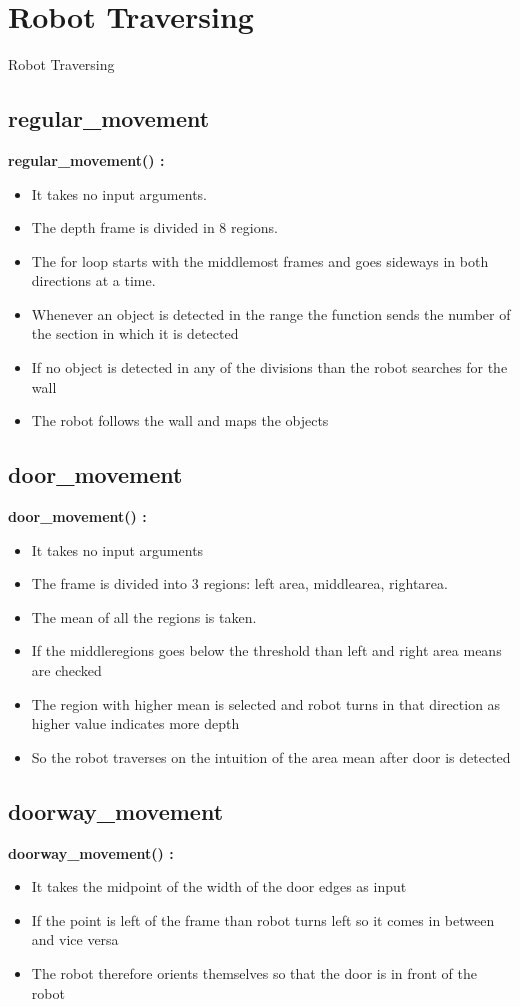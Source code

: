 \documentclass[10pt, a4paper]{beamer}
\begin{document}
\section{Robot Traversing}
\begin{frame}[allowframebreaks]{Robot Traversing}
  \subsection{regular\_movement}
    \textbf{regular\_movement() : }
	\begin{itemize}
	  \item It takes no input arguments.
	  \item The depth frame is divided in 8 regions.
	  \item The for loop starts with the middlemost frames and goes sideways in both directions at a time.
	  \item Whenever an object is detected in the range the function sends the number of the section in which it is detected
	  \item If no object is detected in any of the divisions than the robot searches for the wall
	  \item The robot follows the wall and maps the objects
	\end{itemize}
  \framebreak
  \subsection{door\_movement}
    \textbf{door\_movement() : }
      \begin{itemize}
       \item It takes no input arguments
       \item The frame is divided into 3 regions: left area, middlearea, rightarea.
       \item The mean of all the regions is taken.
       \item If the middleregions goes below the threshold than left and right area means are checked
       \item The region with higher mean is selected and robot turns in that direction as higher value indicates more depth
       \item So the robot traverses on the intuition of the area mean after door is detected
      \end{itemize}
  \framebreak
  \subsection{doorway\_movement}
    \textbf{doorway\_movement() : }
      \begin{itemize}
       \item It takes the midpoint of the width of the door edges as input
       \item If the point is left of the frame than robot turns left so it comes in between and vice versa
       \item The robot therefore orients themselves so that the door is in front of the robot
      \end{itemize}
  \framebreak

\end{frame}
\end{document}
